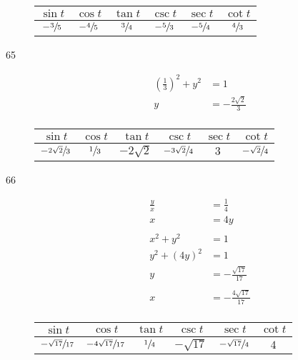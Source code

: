 \documentclass{exam}
\begin{document}
\begin{description}
        \begin{tabular}[H]{cccccc}
          \toprule
          $\sin t$        & $\cos t$        & $\tan t$      & $\csc t$        & $\sec t$        & $\cot t$ \\
          \midrule
          $- \sfrac{3}{5}$ & $- \sfrac{4}{5}$ & $\sfrac{3}{4}$ & $- \sfrac{5}{3}$ & $- \sfrac{5}{4}$ & $\sfrac{4}{3}$ \\
          \bottomrule
        \end{tabular}

      \item[65]
        \begin{align*}
          \left( \frac{1}{3} \right)^2 + y^2 & = 1 \\
          y                                  & = - \frac{2 \sqrt{2}}{3} \\
        \end{align*}

        \begin{tabular}[H]{cccccc}
          \toprule
          $\sin t$                 & $\cos t$      & $\tan t$       & $\csc t$                 & $\sec t$ & $\cot t$ \\
          \midrule
          $- \sfrac{2 \sqrt{2}}{3}$ & $\sfrac{1}{3}$ & $- 2 \sqrt{2}$ & $- \sfrac{3 \sqrt{2}}{4}$ & $3$      & $- \sfrac{\sqrt{2}}{4}$ \\
          \bottomrule
        \end{tabular}

      \item[66]
        \begin{align*}
          \frac{y}{x}  & = \frac{1}{4} \\
          x            & = 4y \\
          \\
          x^2 + y^2    & = 1 \\
          y^2 + (4y)^2 & = 1 \\
          y            & = -\frac{\sqrt{17}}{17} \\
          \\
          x            & = -\frac{4 \sqrt{17}}{17} \\
        \end{align*}

        \begin{tabular}[H]{cccccc}
          \toprule
          $\sin t$                & $\cos t$                  & $\tan t$      & $\csc t$     & $\sec t$               & $\cot t$ \\
          \midrule
          $-\sfrac{\sqrt{17}}{17}$ & $-\sfrac{4 \sqrt{17}}{17}$ & $\sfrac{1}{4}$ & $-\sqrt{17}$ & $-\sfrac{\sqrt{17}}{4}$ & $4$ \\
          \bottomrule
        \end{tabular}


\end{description}
\end{document}
